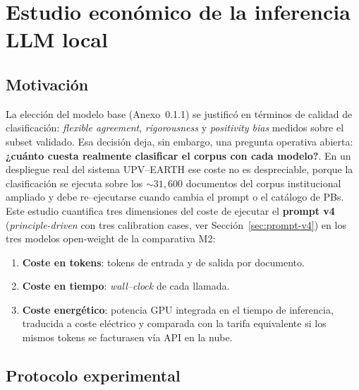 
\section{Estudio económico de la inferencia LLM local}
\label{sec:estudio-economico}

\subsection{Motivación}

La elección del modelo base (Anexo~0.1.1) se justificó en términos de
calidad de clasificación: \emph{flexible agreement}, \emph{rigorousness}
y \emph{positivity bias} medidos sobre el subset validado. Esa decisión
deja, sin embargo, una pregunta operativa abierta: \textbf{¿cuánto cuesta
realmente clasificar el corpus con cada modelo?}. En un despliegue real
del sistema UPV--EARTH ese coste no es despreciable, porque la
clasificación se ejecuta sobre los $\sim 31{,}600$ documentos del corpus
institucional ampliado y debe re--ejecutarse cuando cambia el prompt o
el catálogo de PBs. Este estudio cuantifica tres dimensiones del coste de
ejecutar el \textbf{prompt v4} (\emph{principle-driven} con tres
calibration cases, ver Sección~\ref{sec:prompt-v4}) en los tres modelos
open-weight de la comparativa M2:

\begin{enumerate}
  \item \textbf{Coste en tokens}: tokens de entrada y de salida por documento.
  \item \textbf{Coste en tiempo}: \emph{wall--clock} de cada llamada.
  \item \textbf{Coste energético}: potencia GPU integrada en el tiempo de
        inferencia, traducida a coste eléctrico y comparada con la tarifa
        equivalente si los mismos tokens se facturasen vía API en la nube.
\end{enumerate}

\subsection{Protocolo experimental}

